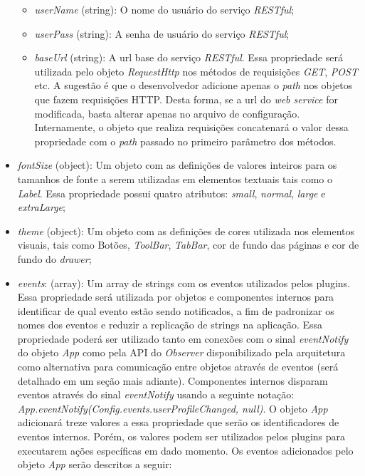 \begin{itemize}
	\begin{itemize}
		\item \textit{userName} (string): O nome do usuário do serviço \textit{RESTful};

		\item \textit{userPass} (string): A senha de usuário do serviço \textit{RESTful};

		\item \textit{baseUrl} (string): A url base do serviço \textit{RESTful}. Essa propriedade será utilizada pelo objeto \textit{RequestHttp} nos métodos de requisições \textit{GET}, \textit{POST} etc. A sugestão é que o desenvolvedor adicione apenas o \textit{path} nos objetos que fazem requisições HTTP. Desta forma, se a url do \textit{web service} for modificada, basta alterar apenas no arquivo de configuração. Internamente, o objeto que realiza requisições concatenará o valor dessa propriedade com o \textit{path} passado no primeiro parâmetro dos métodos.
	\end{itemize}

	\item \textit{fontSize} (object): Um objeto com as definições de valores inteiros para os tamanhos de fonte a serem utilizadas em elementos textuais tais como o \textit{Label}. Essa propriedade possui quatro atributos: \textit{small}, \textit{normal}, \textit{large} e \textit{extraLarge};

	\item \textit{theme} (object): Um objeto com as definições de cores utilizada nos elementos visuais, tais como Botões, \textit{ToolBar}, \textit{TabBar}, cor de fundo das páginas e cor de fundo do \textit{drawer};

	\item \textit{events}: (array): Um array de strings com os eventos utilizados pelos plugins. Essa propriedade será utilizada por objetos e componentes internos para identificar de qual evento estão sendo notificados, a fim de padronizar os nomes dos eventos e reduzir a replicação de strings na aplicação. Essa propriedade poderá ser utilizado tanto em conexões com o sinal \textit{eventNotify} do objeto \textit{App} como pela API do \textit{Observer} disponibilizado pela arquitetura como alternativa para comunicação entre objetos através de eventos (será detalhado em um seção mais adiante). Componentes internos disparam eventos através do sinal \textit{eventNotify} usando a seguinte notação: \textit{App.eventNotify(Config.events.userProfileChanged, null)}. O objeto \textit{App} adicionará treze valores a essa propriedade que serão os identificadores de eventos internos. Porém, os valores podem ser utilizados pelos plugins para executarem ações específicas em dado momento. Os eventos adicionados pelo objeto \textit{App} serão descritos a seguir:


\end{itemize}
